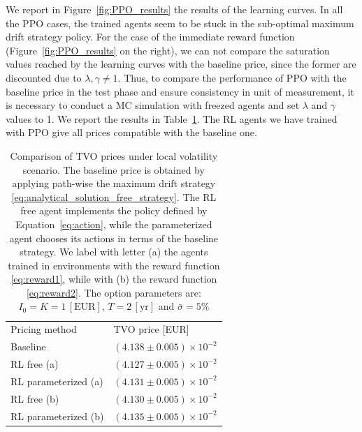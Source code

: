 \documentclass[runningheads]{m2ef}
\begin{document}
	We report in Figure~\ref{fig:PPO_results} the results of the learning curves. In all the PPO cases, the trained agents seem to be stuck in the sub-optimal maximum drift strategy policy. For the case of the immediate reward function (Figure~\ref{fig:PPO_results} on the right), we can not compare the saturation values reached by the learning curves with the baseline price, since the former are discounted due to $\lambda,\gamma \neq 1$.
	Thus, to compare the performance of PPO with the baseline price in the test phase and ensure consistency in unit of measurement, it is necessary to conduct a MC simulation with freezed agents and set $\lambda$ and $\gamma$ values to 1. We report the results in Table~\ref{tab:mc_results_lv}. The RL agents we have trained with PPO give all prices compatible with the baseline one.

	\begin{table}
	\begin{center}
	\caption{Comparison of TVO prices under local volatility scenario. The baseline price is obtained by applying path-wise the maximum drift strategy \eqref{eq:analytical_solution_free_strategy}. The RL free agent implements the policy defined by Equation~\eqref{eq:action}, while the parameterized agent chooses its actions in terms of the baseline strategy. We label with letter (a) the agents trained in environments with the reward function \eqref{eq:reward1}, while with (b) the reward function \eqref{eq:reward2}. The option parameters are: $I_0=K=1\,[\text{EUR}]$, $T=2\,[\text{yr}]$ and $\bar{\sigma}=5\%$}
	\label{tab:mc_results_lv}
	\begin{tabular}{ll}
	\hline\noalign{\smallskip}
	Pricing method & TVO price [EUR] \\
	\noalign{\smallskip}
	\hline
	\noalign{\smallskip}
	Baseline &  $(4.138 \pm 0.005)\times 10^{-2}$\\
	RL free (a) & $(4.127 \pm 0.005) \times 10^{-2}$ \\
	RL parameterized (a) & $(4.131 \pm 0.005) \times 10^{-2}$ \\
	RL free (b) & $(4.130 \pm 0.005) \times 10^{-2}$ \\
	RL parameterized (b) & $(4.135 \pm 0.005) \times 10^{-2}$ \\
	\hline
	\end{tabular}
	\end{center}
	\end{table}
	\setlength{\tabcolsep}{1.4pt}
\end{document}
